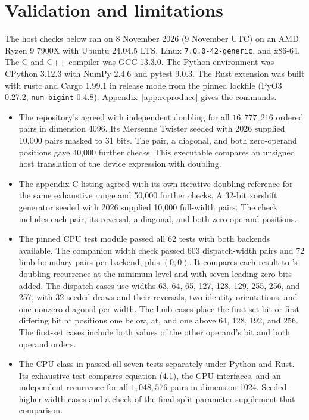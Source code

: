 \documentclass[11pt]{article}
\begin{document}
\section{Validation and limitations}
\label{sec:validation}
The host checks below ran on 8 November 2026 (9 November UTC) on an
AMD Ryzen 9 7900X with Ubuntu 24.04.5 LTS, Linux
\texttt{7.0.0-42-generic}, and x86-64. The C and C++ compiler was GCC
13.3.0. The Python environment was CPython 3.12.3 with NumPy 2.4.6
and pytest 9.0.3. The Rust extension was built with rustc and Cargo
1.99.1 in release mode from the pinned lockfile (PyO3 0.27.2,
\texttt{num-bigint} 0.4.8). Appendix~\ref{app:reproduce} gives the
commands.

\begin{itemize}
\item The repository's 
  agreed with independent doubling for all \(16{,}777{,}216\) ordered
  pairs in dimension 4096. Its Mersenne Twister seeded with 2026
  supplied 10,000 pairs masked to 31 bits. The pair, a diagonal,
  and both zero-operand positions gave 40,000 further checks.
  This executable compares an unsigned host translation of the device
  expression with doubling.
\item The appendix C listing agreed with its own iterative doubling
  reference for the same exhaustive range and 50,000 further checks.
  A 32-bit xorshift generator seeded with 2026 supplied 10,000 full-width
  pairs. The check includes each pair, its reversal, a diagonal,
  and both zero-operand positions.
\item The pinned CPU test module 
  passed all 62 tests with both backends available. The companion width
  check passed 603 dispatch-width pairs and 72 limb-boundary pairs per
  backend, plus \((0,0)\). It compares each result to
  's doubling recurrence at the minimum
  level and with seven leading zero bits added. The dispatch cases use
  widths 63, 64, 65, 127, 128, 129, 255, 256, and 257, with 32
  seeded draws and their reversals, two identity orientations, and one
  nonzero diagonal per width. The limb cases place the first set bit or
  first differing bit at positions one below, at, and one above 64, 128,
  192, and 256. The first-set cases include both values of the other
  operand's bit and both operand orders.
\item The CPU class in
  passed all seven tests separately under Python and Rust. Its exhaustive
  test compares equation (4.1), the CPU interfaces, and an independent
  recurrence for all \(1{,}048{,}576\) pairs in dimension 1024.
  Seeded higher-width cases and a check of the final split parameter
  supplement that comparison.
\end{itemize}
\end{document}

